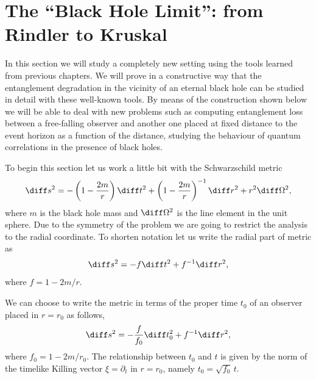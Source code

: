 \section{The ``Black Hole Limit'': from Rindler to Kruskal}\label{sec2m6}



In this section we will study a completely new setting using the tools
learned from previous chapters. We will prove in a
constructive way that the entanglement degradation in the vicinity of an
eternal black hole can be studied in detail with these well-known tools. By
means of the construction shown below we will be able to deal with new
problems such as computing entanglement loss between a free-falling
observer and another one placed at fixed distance to the event horizon as
a function of the distance, studying the behaviour of quantum
correlations in the presence of black holes.

To begin this section let us work a little bit with the Schwarzschild
metric
 \begin{equation}
 \diff s^2=-\left(1-\frac{2m}{r}\right)\diff t^2+\left(1-\frac{2m}{r}\right)^{-1}
 \diff r^2 +r^2\diff \Omega^2,
 \end{equation}
 where $m$ is the black hole mass and $\diff\Omega^2$ is the line element in the unit sphere.
Due to the symmetry of the problem we are going to restrict the analysis
to the radial coordinate. To shorten notation let us write the radial part
of metric as
 \begin{equation}\label{propsch}
 \diff s^2=-f\diff t^2+f^{-1}\diff r^2,
 \end{equation}
 where $f=1-2m/r$.

 We can choose to write the metric in terms of the proper time $t_0$ of an observer placed in $r=r_0$ as follows,
  \begin{equation}\label{propsch2}
 \diff s^2=-\frac{f}{f_0}\diff t_0^2+f^{-1}\diff r^2,
 \end{equation}
where $f_0=1-2m/r_0$.
The relationship between $t_0$ and $t$ is given by the norm of the
timelike Killing vector $\xi=\partial_t$ in $r=r_0$, namely
 $t_0=\sqrt{f_0}\,t$.

